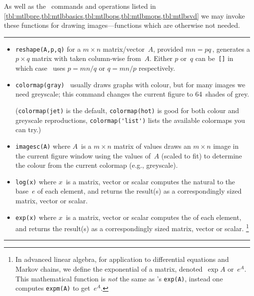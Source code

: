 \begin{table}
\caption{As well as the \script\ commands and operations listed in \cref{tbl:mtlbpre,tbl:mtlbbasics,tbl:mtlbops,tbl:mtlbmops,tbl:mtlbsvd}  we may invoke these functions for drawing images---functions which are otherwise not needed.} \label{tbl:mtlbimag}
\hrule
\begin{minipage}{\linewidth}
\begin{itemize}

\item {}\verb|reshape(A,p,q)| for a \(m\times n\) matrix\slash vector~\(A\), provided \(mn=pq\)\,, generates a \(p\times q\) matrix with  taken column-wise from~\(A\).  
Either \(p\) or~\(q\) can be~\verb|[]| in which case \script\ uses \(p=mn/q\) or \(q=mn/p\) respectively.

\item {}\verb|colormap(gray)| \script\ usually draws graphs with colour, but for many images we need greyscale; this command changes the current figure to 64~shades of grey.  

(\verb|colormap(jet)| is the default, \verb|colormap(hot)| is good for both colour and greyscale reproductions, \verb|colormap('list')| lists the available colormaps you can try.)

\item {}\verb|imagesc(A)| where \(A\)~is a \(m\times n\) matrix of values draws an \(m\times n\) image in the current figure window using the values of~\(A\) (scaled to fit) to determine the colour from the current colormap (e.g., greyscale).

\item {}\verb|log(x)| where \(x\)~is a  matrix, vector or scalar computes the natural  to the base~\(e\) of each element, and returns the result(s) as a correspondingly sized matrix, vector or scalar.

\item {}\verb|exp(x)| where \(x\)~is a  matrix, vector or scalar computes the  of each element, and returns the result(s) as a correspondingly sized matrix, vector or scalar.%
\footnote{In advanced linear algebra, for application to differential equations and Markov chains, we define the exponential of a matrix, denoted~\(\exp A\) or~\(e^A\).  
This mathematical function is \emph{not} the same as \script's \texttt{exp(A)}, instead one computes \texttt{expm(A)} to get~\(e^A\).}

\end{itemize}
\end{minipage}
\hrule
\end{table}









